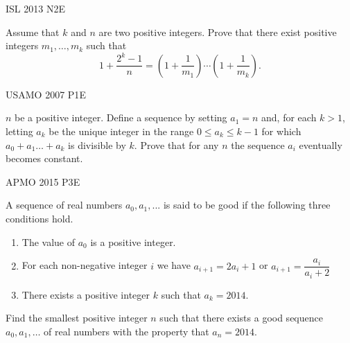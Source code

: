 


{ISL 2013 N2}{E}{
    Assume that $k$ and $n$ are two positive integers. Prove that there exist
    positive integers $m_1, \dots, m_k$ such that
    \[1+\frac{2^k-1}{n}=\left(1+\frac1{m_1}\right)\cdots \left(1+\frac1{m_k}\right).\]

}




{USAMO 2007 P1}{E}{
    $n$ be a positive integer. Define a sequence by setting $a_1=n$ and, for each
    $k>1$, letting $a_k$ be the unique integer in the range $0\leq a_k \leq k-1$
    for which $a_0+a_1\dots +a_k$ is divisible by $k$. Prove that for any $n$ the
    sequence ${a_i}$ eventually becomes constant.

}



{APMO 2015 P3}{E}{
    A sequence of real numbers $a_0, a_1, . . .$ is said to be good if the
    following three conditions hold.
    \begin{enumerate}[itemsep=5pt]
        \item The value of $a_0$ is a positive integer.
        \item For each non-negative integer $i$ we have $a_{i+1} = 2a_i + 1 $
            or $a_{i+1} =\dfrac{a_i}{a_i + 2} $
        \item There exists a positive integer $k$ such that $a_k = 2014$.
    \end{enumerate}
    Find the smallest positive integer $n$ such that there exists a good sequence
    $a_0, a_1, \dots$ of real numbers with the property that $a_n = 2014$.

}

